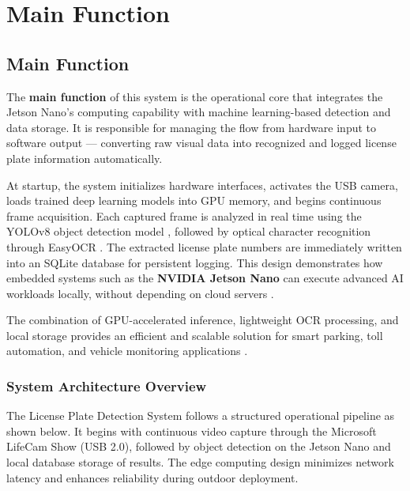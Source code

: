 %
%

\chapter{Main Function}
\section{Main Function}

The \textbf{main function} of this system is the operational core that integrates the Jetson Nano’s computing capability with machine learning-based detection and data storage.  
It is responsible for managing the flow from hardware input to software output — converting raw visual data into recognized and logged license plate information automatically.  

At startup, the system initializes hardware interfaces, activates the USB camera, loads trained deep learning models into GPU memory, and begins continuous frame acquisition.  
Each captured frame is analyzed in real time using the YOLOv8 object detection model \cite{ultralytics2023yolo}, followed by optical character recognition through EasyOCR \cite{jaided2021easyocr}.  
The extracted license plate numbers are immediately written into an SQLite database for persistent logging.  
This design demonstrates how embedded systems such as the \textbf{NVIDIA Jetson Nano} can execute advanced AI workloads locally, without depending on cloud servers \cite{nvidia2024jetson}.  

The combination of GPU-accelerated inference, lightweight OCR processing, and local storage provides an efficient and scalable solution for smart parking, toll automation, and vehicle monitoring applications \cite{pathak2023edgeai}.

\subsection{System Architecture Overview}

The License Plate Detection System follows a structured operational pipeline as shown below.  
It begins with continuous video capture through the Microsoft LifeCam Show (USB 2.0), followed by object detection on the Jetson Nano and local database storage of results.  
The edge computing design minimizes network latency and enhances reliability during outdoor deployment.

